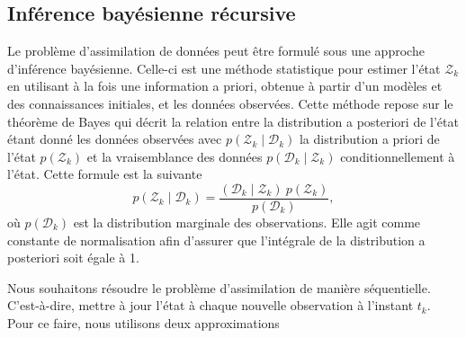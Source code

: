 \subsection{Inférence bayésienne récursive}

Le problème d'assimilation de données peut être formulé sous une approche d'inférence bayésienne. Celle-ci est une méthode statistique pour estimer l'état $\mathcal Z_k$ en utilisant à la fois une information a priori, obtenue à partir d'un modèles et des connaissances initiales, et les données observées. Cette méthode repose sur le théorème de Bayes qui décrit la relation entre la distribution a posteriori de l'état étant donné les données observées avec $p(\mathcal Z_k \mid \mathcal D_k)$ la distribution a priori de l'état $p(\mathcal Z_k)$ et la vraisemblance des données $p(\mathcal D_k \mid \mathcal Z_k)$ conditionnellement à l'état. Cette formule est la suivante
\begin{equation*}
    p(\mathcal Z_k \mid \mathcal D_k) = \frac{(\mathcal D_k \mid \mathcal Z_k)~p(\mathcal Z_k)}{p(\mathcal D_k)},
\end{equation*}où $p(\mathcal D_k)$  est la distribution marginale des observations. Elle agit comme constante de normalisation afin d'assurer que l'intégrale de la distribution a posteriori soit égale à 1.


Nous souhaitons résoudre le problème d'assimilation de manière séquentielle. C'est-à-dire, mettre à jour l'état à chaque nouvelle observation à l'instant $t_k$. Pour ce faire, nous utilisons deux approximations

